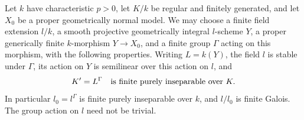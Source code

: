 \begin{lemma}
\label{B:equivariant-constant-data}
Let $k$ have characteristic $p>0$, let $K/k$ be regular and
finitely generated, and let $X_0$ be a proper geometrically
normal model.  We may choose a finite field extension $l/k$,
a smooth projective geometrically integral $l$-scheme $Y$, a
proper generically finite $k$-morphism $Y\to X_0$, and a finite
group $\Gamma$ acting on this morphism, with the following
properties.  Writing $L=k(Y)$, the field $l$ is stable under
$\Gamma$, its action on $Y$ is semilinear over this action on
$l$, and
\[
 K'=L^\Gamma\quad\hbox{is finite purely inseparable over }K.
\]
In particular $l_0=l^\Gamma$ is finite purely inseparable over
$k$, and $l/l_0$ is finite Galois.  The group action on $l$
need not be trivial.
\end{lemma}

